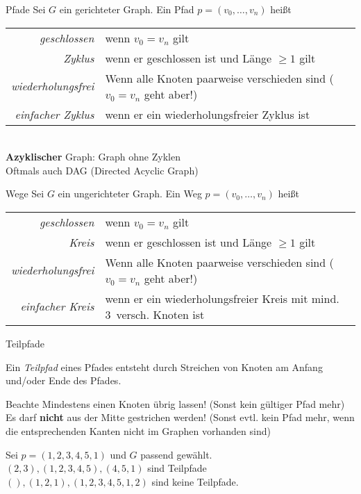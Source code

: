 \begin{frame}[t]{Pfade}
	Sei $G$ ein gerichteter Graph.{\hphantom{un}} Ein Pfad $p = (v_0, \dots, v_n)$ heißt
	\begin{tabular}{>{\itshape}rp{}}
		geschlossen & wenn $v_0 = v_n$ gilt  \\
		Zyklus & wenn er geschlossen ist und Länge $\geq 1$ gilt \\
		wiederholungsfrei & Wenn alle Knoten paarweise verschieden sind \newline ($v_0 = v_n$ geht aber!) \\
		einfacher Zyklus &  wenn er ein wiederholungsfreier Zyklus ist  \\
	\end{tabular}
	\medskip \\
	\textbf{Azyklischer} Graph: Graph ohne Zyklen\\
	\impl Oftmals auch DAG (Directed Acyclic Graph)
\end{frame}

\begin{frame}[t]{Wege}
	Sei $G$ ein \alert{un}gerichteter Graph. Ein \alert{Weg} $p = (v_0, \dots, v_n)$ heißt
	\begin{tabular}{>{\itshape}rp{}}
		geschlossen & wenn $v_0 = v_n$ gilt  \\
		\alert{Kreis} & wenn er geschlossen ist und Länge $\geq 1$ gilt \\
		wiederholungsfrei & Wenn alle Knoten paarweise verschieden sind \newline ($v_0 = v_n$ geht aber!) \\
		einfacher \alert{Kreis} &  wenn er ein wiederholungsfreier Kreis \alert{mit mind. 3~versch. Knoten} ist  \\
	\end{tabular}

\end{frame}

\begin{frame}{Teilpfade}
	\begin{Definition}
		Ein \emph{Teilpfad} eines Pfades entsteht durch Streichen von Knoten am Anfang und/oder Ende des Pfades.
	\end{Definition}

	\pause
	\begin{block}{Beachte}
		Mindestens einen Knoten übrig lassen! (Sonst kein gültiger Pfad mehr)\\
		Es darf \textbf{nicht} aus der Mitte gestrichen werden! (Sonst evtl. kein Pfad mehr, wenn die entsprechenden Kanten nicht im Graphen vorhanden sind)
	\end{block}

	\pause
	\begin{Beispiel}
		Sei $p = (1, 2, 3, 4, 5, 1)$ und $G$ passend gewählt.\\
		\pause
		$(2, 3), (1, 2, 3, 4, 5), (4, 5, 1)$ sind Teilpfade\\
		$(), (1, 2, 1), (1, 2, 3, 4, 5, 1, 2)$ sind keine Teilpfade.
	\end{Beispiel}
\end{frame}


